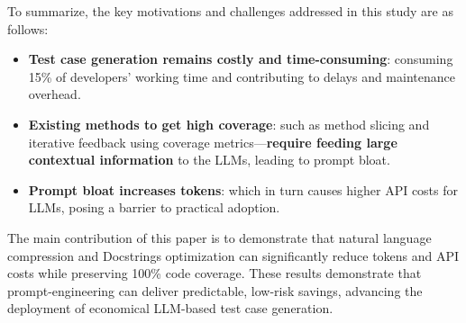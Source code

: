 To summarize, the key motivations and challenges addressed in this study are as follows:

\begin{itemize}[label={$\bullet$}]
    \item \textbf{Test case generation remains costly and time-consuming}: consuming 15\% of developers’ working time and contributing to delays and maintenance overhead.
    \vspace{0.2cm}
    
    \item \textbf{Existing methods to get high coverage}: such as method slicing and iterative feedback using coverage metrics—\textbf{require feeding large contextual information} to the LLMs, leading to prompt bloat.
    \vspace{0.2cm}
    
    \item \textbf{Prompt bloat increases tokens}: which in turn causes higher API costs for LLMs, posing a barrier to practical adoption.
\end{itemize}

The main contribution of this paper is to demonstrate that natural language compression and Docstrings optimization can significantly reduce tokens and API costs while preserving 100\% code coverage. These results demonstrate that prompt-engineering can deliver predictable, low-risk savings, advancing the deployment of economical LLM-based test case generation.
